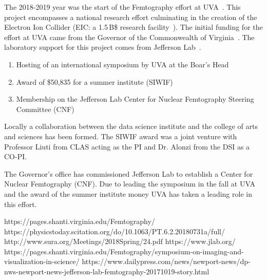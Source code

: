 The 2018-2019 year was the start of the Femtography effort at UVA~\cite{ref:siwif}. This project encompasses a national research effort culminating in the creation of the Electron Ion Collider (EIC: a 1.5\,B\$ research facility~\cite{ref:eic}). The initial funding for the effort at UVA came from the Governor of the Commonwealth of Virginia~\cite{ref:cnf}. The laboratory support for this project comes from Jefferson Lab~\cite{ref:jlab}.

\begin{enumerate}
\item Hosting of an international symposium by UVA at the Boar's Head~\cite{ref:symp}
\item Award of \$50,835 for a summer institute (SIWIF)
\item Membership on the Jefferson Lab Center for Nuclear Femtography Steering Committee (CNF)
\end{enumerate}

Locally a collaboration between the data science institute and the college of arts and sciences has been formed. The SIWIF award was a joint venture with Professor Liuti from CLAS acting as the PI and Dr. Alonzi from the DSI as a CO-PI.

The Governor's office has commissioned Jefferson Lab to establish a Center for Nuclear Femtography (CNF). Due to leading the symposium in the fall at UVA and the award of the summer institute money UVA has taken a leading role in this effort.

\begin{thebibliography}{99}
 https://pages.shanti.virginia.edu/Femtography/
 https://physicstoday.scitation.org/do/10.1063/PT.6.2.20180731a/full/
 http://www.sura.org/Meetings/2018Spring/24.pdf
 https://www.jlab.org/
 https://pages.shanti.virginia.edu/Femtography/symposium-on-imaging-and-visualization-in-science/
 https://www.dailypress.com/news/newport-news/dp-nws-newport-news-jefferson-lab-femtography-20171019-story.html
\end{thebibliography}
